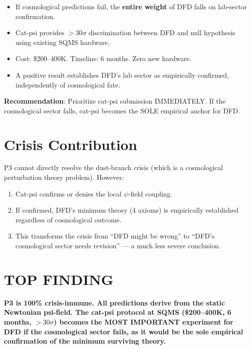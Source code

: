 \documentclass[11pt]{article}
\begin{document}
\begin{itemize}
\item If cosmological predictions fail, the \textbf{entire weight} of DFD
  falls on lab-sector confirmation.
\item Cat-psi provides $>30\sigma$ discrimination between DFD and null
  hypothesis using existing SQMS hardware.
\item Cost: \$200--400K. Timeline: 6 months. Zero new hardware.
\item A positive result establishes DFD's lab sector as empirically
  confirmed, independently of cosmological fate.
\end{itemize}

\textbf{Recommendation}: Prioritize cat-psi submission IMMEDIATELY.
If the cosmological sector falls, cat-psi becomes the SOLE empirical
anchor for DFD.

\section{Crisis Contribution}

P3 cannot directly resolve the dust-branch crisis (which is a cosmological
perturbation theory problem). However:

\begin{enumerate}
\item Cat-psi confirms or denies the local $\psi$-field coupling.
\item If confirmed, DFD's minimum theory (4 axioms) is empirically
  established regardless of cosmological outcome.
\item This transforms the crisis from ``DFD might be wrong'' to
  ``DFD's cosmological sector needs revision'' --- a much less severe
  conclusion.
\end{enumerate}

\section*{TOP FINDING}

\begin{tcolorbox}[colback=blue!5!white, colframe=blue!70!black]
\textbf{P3 is 100\% crisis-immune. All predictions derive from the static
Newtonian psi-field. The cat-psi protocol at SQMS (\$200--400K, 6 months,
$>30\sigma$) becomes the MOST IMPORTANT experiment for DFD if the
cosmological sector fails, as it would be the sole empirical confirmation
of the minimum surviving theory.}
\end{tcolorbox}
\end{document}
